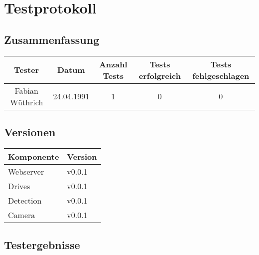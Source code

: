 \section{Testprotokoll}
\label{sec:testprotokoll}

\subsection{Zusammenfassung}

\begin{table}[h!]
	\centering
	\renewcommand{\arraystretch}{1.5}
	\begin{tabular}{|c|c|c|c|c|}
		\hline \textbf{Tester} & \textbf{Datum} & \textbf{Anzahl Tests} & \textbf{Tests erfolgreich} & \textbf{Tests fehlgeschlagen} \\
		\hline Fabian Wüthrich & 24.04.1991 & 1 & 0 & 0 \\ 
		\hline 
	\end{tabular}
\end{table}

\subsection{Versionen}

\begin{table}[h!]
	\centering
	\renewcommand{\arraystretch}{1.5}
	\begin{tabular}{|l|l|}
		\hline \textbf{Komponente} & \textbf{Version} \\
		\hline Webserver & v0.0.1 \\
		\hline Drives & v0.0.1 \\
		\hline Detection & v0.0.1 \\
		\hline Camera & v0.0.1 \\
		\hline 
	\end{tabular}
\end{table}

\newpage
\subsection{Testergebnisse}


